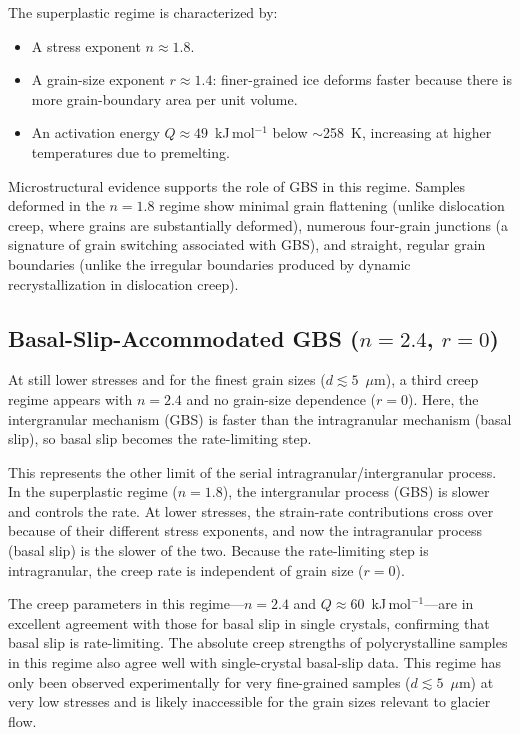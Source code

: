 \documentclass[11pt]{article}
\begin{document}
\noindent The superplastic regime is characterized by:
\begin{itemize}
  \item A stress exponent $n \approx 1.8$.
  \item A grain-size exponent $r \approx 1.4$: finer-grained ice deforms faster because there is more grain-boundary area per unit volume.
  \item An activation energy $Q \approx 49$~kJ\,mol$^{-1}$ below $\sim$258~K, increasing at higher temperatures due to premelting.
\end{itemize}

\noindent Microstructural evidence supports the role of GBS in this regime.  Samples deformed in the $n = 1.8$ regime show minimal grain flattening (unlike dislocation creep, where grains are substantially deformed), numerous four-grain junctions (a signature of grain switching associated with GBS), and straight, regular grain boundaries (unlike the irregular boundaries produced by dynamic recrystallization in dislocation creep).

\subsection{Basal-Slip-Accommodated GBS ($n = 2.4$, $r = 0$)}
\label{sec:basal_slip}

At still lower stresses and for the finest grain sizes ($d \lesssim 5$~$\mu$m), a third creep regime appears with $n = 2.4$ and no grain-size dependence ($r = 0$).  Here, the intergranular mechanism (GBS) is faster than the intragranular mechanism (basal slip), so basal slip becomes the rate-limiting step.

\medskip
\noindent This represents the other limit of the serial intragranular/intergranular process.  In the superplastic regime ($n = 1.8$), the intergranular process (GBS) is slower and controls the rate.  At lower stresses, the strain-rate contributions cross over because of their different stress exponents, and now the intragranular process (basal slip) is the slower of the two.  Because the rate-limiting step is intragranular, the creep rate is independent of grain size ($r = 0$).

\medskip
\noindent The creep parameters in this regime---$n = 2.4$ and $Q \approx 60$~kJ\,mol$^{-1}$---are in excellent agreement with those for basal slip in single crystals, confirming that basal slip is rate-limiting.  The absolute creep strengths of polycrystalline samples in this regime also agree well with single-crystal basal-slip data.  This regime has only been observed experimentally for very fine-grained samples ($d \lesssim 5$~$\mu$m) at very low stresses and is likely inaccessible for the grain sizes relevant to glacier flow.
\end{document}
